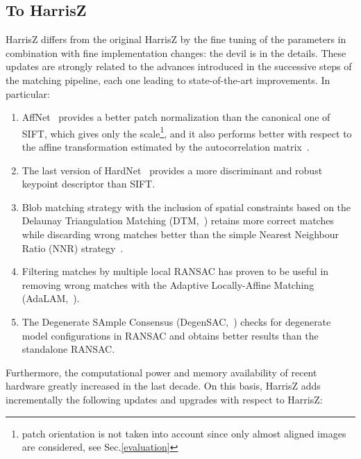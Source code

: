\documentclass[times,twocolumn,final,authoryear]{elsarticle}
\begin{document}
\subsection{To HarrisZ}\label{hzplus} 
HarrisZ differs from the original HarrisZ by the fine tuning of the parameters in combination with fine implementation changes: the devil is in the details. These updates are strongly related to the advances introduced in the successive steps of the matching pipeline, each one leading to state-of-the-art improvements. In particular:
\begin{enumerate}[i]
    \item\label{affnet}AffNet~\citep{affnet} provides a better patch normalization than the canonical one of SIFT, which gives only the scale\footnote{patch orientation is not taken into account since only almost aligned images are considered, see Sec.\ref{evaluation}}, and it also performs better with respect to the affine transformation estimated by the autocorrelation matrix~\citep{hess_lapl_affine}.
    \item\label{hardnet8}The last version of HardNet~\citep{hardnet8} provides a more discriminant and robust keypoint descriptor than SIFT.
    \item\label{dtm}Blob matching strategy with the inclusion of spatial constraints based on the Delaunay Triangulation Matching (DTM,~\cite{blob_dtm}) retains more correct matches while discarding wrong matches better than the simple Nearest Neighbour Ratio (NNR) strategy~\citep{sift}.
    \item\label{adalam}Filtering matches by multiple local RANSAC has proven to be useful in removing wrong matches with the Adaptive Locally-Affine Matching (AdaLAM,~\cite{adalam}).
    \item\label{degensac}The Degenerate SAmple Consensus (DegenSAC,~\citep{degensac}) checks for degenerate model configurations in RANSAC and obtains better results than the standalone RANSAC. 
\end{enumerate}
Furthermore, the computational power and memory availability of recent hardware greatly increased in the last decade. On this basis, HarrisZ adds incrementally the following updates and upgrades with respect to HarrisZ:
\end{document}

